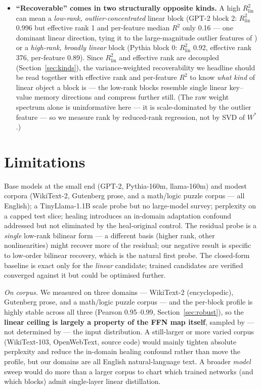 \documentclass{article}
\newcommand{\Rlin}{R^2_{\mathrm{lin}}}
\begin{document}
\begin{itemize}
  least-squares ceiling removes the confound and should be standard practice.
\item \textbf{``Recoverable'' comes in two structurally opposite kinds.} A high $\Rlin$ can mean a
  \emph{low-rank, outlier-concentrated} linear block (GPT-2 block 2: $\Rlin$ 0.996 but effective
  rank 1 and per-feature median $R^2$ only 0.16 --- one dominant linear direction, tying it to the
  large-magnitude outlier features of \citealp{dettmers2022llmint8}) or a \emph{high-rank, broadly
  linear} block (Pythia block 0: $\Rlin$ 0.92, effective rank 376, per-feature 0.89). Since $\Rlin$
  and effective rank are decoupled (Section~\ref{sec:kinds}), the variance-weighted recoverability we
  headline should be read together with effective rank and per-feature $R^2$ to know \emph{what kind}
  of linear object a block is --- the low-rank blocks resemble single linear key--value memory
  directions \citep{geva2021kv} and compress further still. (The raw weight spectrum alone is
  uninformative here --- it is scale-dominated by the outlier feature --- so we measure rank by
  reduced-rank regression, not by SVD of $W^{*}$.)
\end{itemize}

\section{Limitations}
\label{sec:limitations}

Base models at the small end (GPT-2, Pythia-160m, llama-160m) and modest corpora (WikiText-2,
Gutenberg prose, and a math/logic puzzle corpus --- all English); a TinyLlama-1.1B scale probe but
no large-model survey; perplexity on a capped test slice; healing introduces an in-domain adaptation
confound addressed but not eliminated by the heal-original control. The residual probe is a
\emph{single} low-rank bilinear form --- a different basis (higher rank, other nonlinearities) might
recover more of the residual; our negative result is specific to low-order bilinear recovery, which
is the natural first probe. The closed-form baseline is exact only for the \emph{linear} candidate;
trained candidates are verified converged against it but could be optimised further.

\emph{On corpus.} We measured on three domains --- WikiText-2 (encyclopedic), Gutenberg prose, and a
math/logic puzzle corpus --- and the per-block profile is highly stable across all three (Pearson
0.95--0.99, Section~\ref{sec:robust}), so the \textbf{linear ceiling is largely a property of the
FFN map itself}, sampled by --- not determined by --- the input distribution. A still-larger or more
varied corpus (WikiText-103, OpenWebText, source code) would mainly tighten absolute perplexity and
reduce the in-domain healing confound rather than move the profile, but our domains are all English
natural-language text. A broader \emph{model} sweep would do more than a larger corpus to chart which
trained networks (and which blocks) admit single-layer linear distillation.
\end{document}
